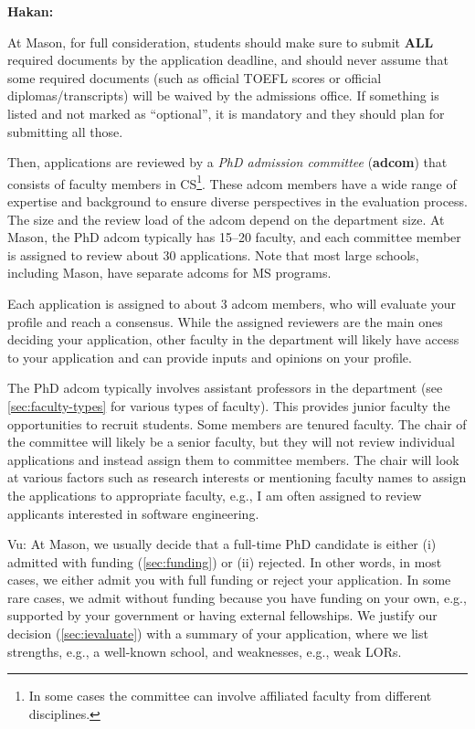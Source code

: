 \documentclass[oneside,11pt,dvipsnames]{book}
\newenvironment{commentbox}[1][]{
  \small
  \begin{mybox}
    {\small \textbf{#1}}
  }{
  \end{mybox}
}
\begin{document}
\begin{commentbox}[Hakan:]
  At Mason, for full consideration, students should make sure to submit \textbf{ALL} required documents by the application deadline, and should never assume that some required documents (such as official TOEFL scores or official diplomas/transcripts) will be waived by the admissions office. If something is listed and not marked as ``optional'', it is mandatory and they should plan for submitting all those.
\end{commentbox}

Then, applications are reviewed by a \emph{PhD admission committee} (\textbf{adcom}) that consists of faculty members in CS\footnote{In some cases the committee can involve affiliated faculty from different disciplines.}. These adcom members have a wide range of expertise and background to ensure diverse perspectives in the evaluation process. The size and the review load of the adcom depend on the department size. At Mason, the PhD adcom typically has 15--20 faculty, and each committee member is assigned to review about 30 applications. Note that most large schools, including Mason, have separate adcoms for MS programs.

Each application is assigned to about 3 adcom members, who will evaluate your profile and reach a consensus.  While the assigned reviewers are the main ones deciding your application, other faculty in the department will likely have access to your application and can provide inputs and opinions on your profile.

The PhD adcom typically involves assistant professors in the department (see \autoref{sec:faculty-types} for various types of faculty). This provides junior faculty the opportunities to recruit students. Some members are tenured faculty. The chair of the committee will likely be a senior faculty, but they will not review individual applications and instead assign them to committee members. The chair will look at various factors such as research interests or mentioning faculty names to assign the applications to appropriate faculty, e.g., I am often assigned to review applicants interested in software engineering.

\begin{commentbox}{Vu:}
At Mason, we usually decide that a full-time PhD candidate is either (i) admitted with funding (\autoref{sec:funding}) or (ii) rejected. In other words, in most cases, we either
admit you with full funding or reject your application. In some rare cases, we admit
without funding because you have funding on your own, e.g.,
supported by your government or having external fellowships. We justify
our decision (\autoref{sec:ievaluate}) with a summary of your application, where we list
strengths, e.g., a well-known school, and weaknesses, e.g., weak
LORs.
\end{commentbox}
\end{document}
